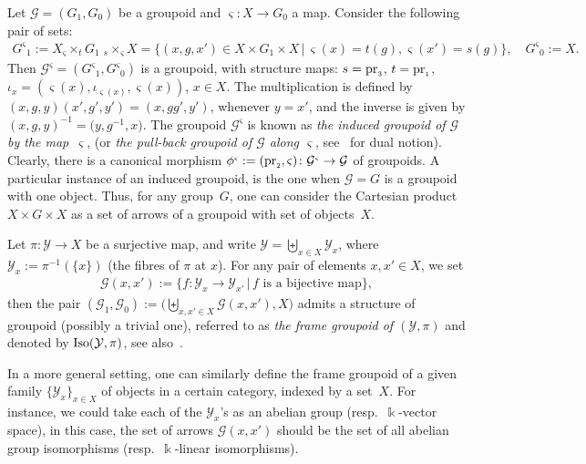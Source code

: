 \documentclass[pdftex]{sigma}
\numberwithin{equation}{section}
\newcommand{\Go}{\cG_{\Sscript{0}}}
\newcommand{\Ga}{\cG_{\Sscript{1}}}
\newcommand{\cG}{{\mathcal G}}
\newcommand{\cY}{{\mathcal Y}}
\newcommand{\Sscript}[1]{\scriptscriptstyle{#1}}
\newcommand{\due}[3]{{}_{{#2 }} {#1}_{{ #3}} }
\begin{document}
\begin{Example}\label{exam:induced}Let $\cG=(G_{\Sscript{1}}, G_{\Sscript{0}})$ be a groupoid and $\varsigma\colon X \to G_{\Sscript{0}}$ a map. Consider the following pair of sets:
\begin{gather*}
G^{\Sscript{\varsigma}}{}_{\Sscript{1}}:= X \due \times {\Sscript{\varsigma}} { \Sscript{t}} G_{\Sscript{1}} \; \due \times {\Sscript{s}} { \Sscript{\varsigma}} X= \big\{ (x,g,x')
\in X\times G_{\Sscript{1}}\times X\,| \, \varsigma(x)=t(g), \varsigma(x')=s(g) \big\}, \quad G^{\Sscript{\varsigma}}{}_{\Sscript{0}}:=X.
\end{gather*}
Then $\cG^{\Sscript{\varsigma}}{}=(G^{\Sscript{\varsigma}}{}_{\Sscript{1}}, G^{\Sscript{\varsigma}}{}_{\Sscript{0}})$ is a groupoid, with structure maps: $s= {\rm pr}_{\Sscript{3}}$, $t= {\rm pr}_{\Sscript{1}}$, $\iota_{\Sscript{x}}=(\varsigma(x), \iota_{\Sscript{\varsigma(x)}}, \varsigma(x))$, $x \in X$. The multiplication is defined by $(x,g,y) (x',g',y')= ( x,gg',y')$, whenever $y=x'$, and the inverse is given by $(x,g,y)^{-1}=\big(y,g^{-1},x\big)$. The groupoid $\cG^{\Sscript{\varsigma}}$ is known as \emph{the induced groupoid of $\cG$ by the map~$\varsigma$}, (or \emph{the
pull-back groupoid of $\cG$ along $\varsigma$}, see~\cite{Higgins:1971} for dual notion). Clearly, there is a canonical morphism $\phi^{\Sscript{\varsigma}}:=({\rm pr}_{\Sscript{2}},
\varsigma)\colon \cG^{\Sscript{\varsigma}} \to \cG$ of groupoids. A particular instance of an induced groupoid, is the one when $\cG=G$ is a groupoid with one object. Thus, for any group~$G$, one can consider the Cartesian product $X \times G \times X$ as a set of arrows of a groupoid with set of objects~$X$.
\end{Example}

\begin{Example}\label{exam:frame}Let $\pi\colon \cY \to X$ be a surjective map, and write $\cY =\biguplus_{\Sscript{ x \in X }} \cY_{\Sscript{x}}$, where $\cY_{\Sscript{x}}:=\pi^{-1}(\{x\})$ (the fibres of $\pi$ at $x$). For any pair of elements $x, x' \in X$, we set
\begin{gather*}
\cG(x,x'):=\big\{ f \colon \cY_{\Sscript{x}} \to \cY_{\Sscript{x'}}\,|\, f \text{ is a bijective map} \big\},
\end{gather*}
then the pair $(\Ga, \Go):=\big(\biguplus_{\Sscript{x, x' \in X}} \cG(x,x'), X\big)$ admits a structure of groupoid (possibly a trivial one), referred to as \emph{the frame groupoid of $(\cY, \pi)$} and denoted by ${\rm Iso}(\cY, \pi)$, see also~\cite{Renault:1980}.

In a more general setting, one can similarly define the frame groupoid of a given family $\{\cY_{\Sscript{x}}\}_{x \in X}$ of objects in a certain category, indexed by a set~$X$. For instance, we could take each of the $\cY_{\Sscript{x}}$'s as an abelian group (resp.~$\Bbbk$-vector space), in this case, the set of arrows $\cG(x,x')$ should be the set of all abelian group isomorphisms (resp.~$\Bbbk$-linear isomorphisms).
\end{Example}
\end{document}
